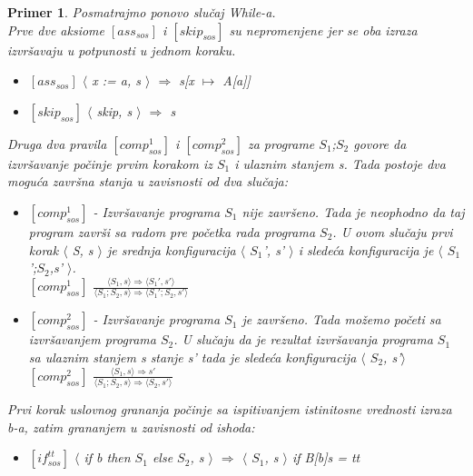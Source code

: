 \documentclass[a4paper]{article}
\newtheorem{primer}{Primer}[section]
\begin{document}
{\begin{primer} Posmatrajmo ponovo slučaj \textit{While-a}.\\
Prve dve aksiome $[ass_{sos}]$ i $[skip_{sos}]$  su nepromenjene jer se oba izraza izvršavaju u potpunosti u jednom koraku.
\begin{itemize}
	\item $[ass_{sos}]$ \hspace{1cm} $\langle$ \textit{x := a, s} $\rangle$ $\Longrightarrow$ \textit{s}[\textit{x $\mapsto$ A}[\textit{a}]]
	\item $[skip_{sos}]$ \hspace{1cm} $\langle$ skip, \textit{s} $\rangle$ $\Longrightarrow$ \textit{s}
\end{itemize} 
Druga dva pravila $[comp^{1}_{sos}]$ i $[comp^{2}_{sos}]$ za programe $S_1$;$S_2$ govore da izvršavanje počinje prvim korakom iz $S_1$ i ulaznim stanjem s. Tada postoje dva moguća završna stanja u zavisnosti od dva slučaja:
\begin{itemize}
	\item $[comp^{1}_{sos}]$ - Izvršavanje programa $S_1$ nije završeno. Tada je neophodno da taj program završi sa radom pre početka rada programa $S_2$. U ovom slučaju prvi korak $\langle$ \textit{S, s} $\rangle$ je srednja konfiguracija  $\langle$ \textit{$S_1$', s'} $\rangle$ i sledeća konfiguracija je  $\langle$ \textit{$S_1$';$S_2$,s'} $\rangle$.\\
	$[comp^1_{sos}]$ \hspace{1cm} {\large $\frac{\langle S_1, s \rangle \Longrightarrow \langle S_1', s' \rangle}{\langle S_1;S_2,s \rangle \Longrightarrow \langle S_1';S_2,s' \rangle}$}
	\item $[comp^2_{sos}]$ - Izvršavanje programa $S_1$  je završeno. Tada možemo početi sa izvršavanjem programa $S_2$. U slučaju da je rezultat izvršavanja programa $S_1$ sa ulaznim stanjem s stanje s' tada je sledeća konfiguracija $\langle$ $S_2$, s'$\rangle$ \\
	$[comp^2_{sos}]$ \hspace{1cm}  {\large $\frac{\langle S_1, s \rangle \Longrightarrow s'}{\langle S_1;S_2,s \rangle \Longrightarrow \langle S_2, s'\rangle}$}
\end{itemize} 
Prvi korak uslovnog grananja počinje sa ispitivanjem istinitosne vrednosti izraza \textit{b}-a, zatim grananjem u zavisnosti od ishoda:
\begin{itemize}
	\item $[if^{tt}_{sos}]$ $\langle$ if b then $S_1$ else $S_2$, s $\rangle$ $\Longrightarrow$ $\langle$ $S_1$, s $\rangle$ \hspace{1cm} if B[b]s = tt

\end{itemize}
\end{primer}}
\end{document}
